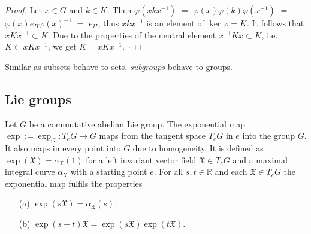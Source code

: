 \documentclass[envcountsect,runningheads]{llncs}
\renewcommand{\qed}{\hfill$\square$}
\begin{document}
\begin{proof}
Let $x \in G$ and $k \in K$. Then $\varphi(xkx^{-1})$ $=$ $\varphi(x)\varphi(k)\varphi(x^{-1})$ $=$ $\varphi(x)e_H\varphi(x)^{-1}$ $=$ $e_H$, thus $xkx^{-1}$ is an element of $\ker \varphi = K$. It follows that $xKx^{-1} \subset K$. Due to the properties of the neutral element $x^{-1}Kx \subset K$, i.e. $K \subset xKx^{-1}$, we get $K = xKx^{-1}$. \qed
\end{proof}

\begin{remark}
Similar as subsets behave to sets, \emph{subgroups} behave to groups. 
\end{remark}


\subsection{Lie groups}
\begin{definition}
Let $G$ be a commutative abelian Lie group. The exponential map $\exp := \exp_G : T_eG \rightarrow G$ maps from the tangent space $T_eG$ in $e$ into the group $G$. It also maps in every point into $G$ due to homogeneity. It is defined as $\exp(\mathfrak{X}) = \alpha_{\mathfrak{X}} (1)$ for a left invariant vector field $\mathfrak{X} \in T_eG$ and a maximal integral curve $\alpha_{\mathfrak{X}}$ with a starting point $e$. For all $s,t \in \mathbb{R}$ and each $\mathfrak{X} \in T_eG$ the exponential map fulfils the properties
\begin{itemize}
	\item[(a)] $\exp(s\mathfrak{X}) = \alpha_{\mathfrak{X}}(s)$,
	\item[(b)] $\exp(s+t) \mathfrak{X} = \exp(s\mathfrak{X}) \exp(t \mathfrak{X})$.
\end{itemize}
\end{definition}
\end{document}
